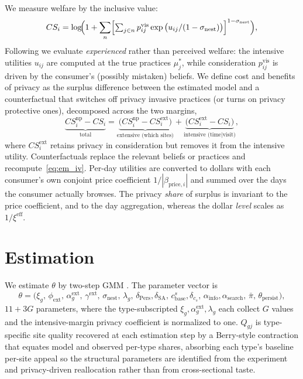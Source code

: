 \documentclass[12pt]{article}
\theoremstyle{definition}
\theoremstyle{remark}
\begin{document}
{We measure welfare by the inclusive value:
\begin{equation}\label{eq:em_iv}
  CS_i = \log\!\Bigl(1 + \sum_{n} \Bigl[\textstyle\sum_{j \in n} p^{\text{vis}}_{ij} \exp{\bigl(u_{ij}/(1 - \sigma_{\text{nest}})\bigr)}\Bigr]^{1 - \sigma_{\text{nest}}}\Bigr),
\end{equation}
Following \citet{train2015} we evaluate \emph{experienced} rather than perceived welfare: the intensive utilities $u_{ij}$ are computed at the true practices $\mu^*_j$, while consideration $p^{\text{vis}}_{ij}$ is driven by the consumer's (possibly mistaken) beliefs. We define cost and benefits of privacy as the surplus difference between the estimated model and a counterfactual that switches off privacy invasive practices (or turns on privacy protective ones), decomposed across the two margins,
\begin{equation*}
  \underbrace{CS^{\text{np}}_i - CS_i}_{\text{total}} = \underbrace{\bigl(CS^{\text{np}}_i - CS^{\text{ext}}_i\bigr)}_{\text{extensive (which sites)}} + \underbrace{\bigl(CS^{\text{ext}}_i - CS_i\bigr)}_{\text{intensive (time} \mid \text{visit)}},
\end{equation*}
where $CS^{\text{ext}}_i$ retains privacy in consideration but removes it from the intensive utility. Counterfactuals replace the relevant beliefs or practices and recompute~\eqref{eq:em_iv}. Per-day utilities are converted to dollars with each consumer's own conjoint price coefficient $1/|\beta_{\text{price},i}|$ and summed over the days the consumer actually browses. The privacy \emph{share} of surplus is invariant to the price coefficient, and to the day aggregation, whereas the dollar \emph{level} scales as $1/\xi^{\text{eff}}$.

\section{Estimation}\label{sec:estimation}

We estimate $\theta$ by two-step GMM \citep{hansen1982large}. The parameter vector is
\begin{equation*}
  \theta = \bigl(\xi_g,\, \phi_{\text{ext}},\, \alpha^{\text{ext}}_g,\, \gamma^{\text{ext}},\, \sigma_{\text{nest}},\, \lambda_g,\, \delta_{\text{Pers}}, \delta_{\text{SA}},\, c^s_{\text{base}}, \delta_{c_s},\, \alpha_{\text{info}}, \alpha_{\text{search}},\, \bar\pi,\, \theta_{\text{persist}}\bigr),
\end{equation*}
$11 + 3G$ parameters, where the type-subscripted $\xi_g, \alpha^{\text{ext}}_g, \lambda_g$ each collect $G$ values and the intensive-margin privacy coefficient is normalized to one. $Q_{gj}$ is type-specific site quality recovered at each estimation step by a Berry-style contraction \citep{berry1994estimating,berry1995automobile} that equates model and observed per-type shares, absorbing each type's baseline per-site appeal so the structural parameters are identified from the experiment and privacy-driven reallocation rather than from cross-sectional taste.

}
\end{document}
